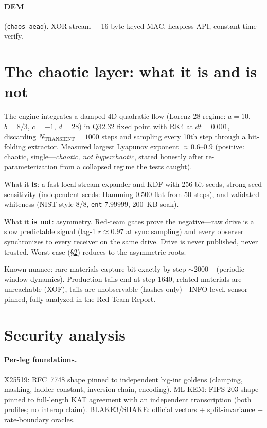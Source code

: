 \documentclass[11pt,a4paper]{article}
\begin{document}
\paragraph{DEM} (\texttt{chaos-aead}).
XOR stream + 16-byte keyed MAC, heapless API, constant-time verify.

\section{The chaotic layer: what it is and is not}

The engine integrates a damped 4D quadratic flow (Lorenz-28 regime:
$a=10$, $b=8/3$, $c=-1$, $d=28$) in Q32.32 fixed point with RK4 at $dt=0.001$,
discarding $N_{\mathrm{TRANSIENT}}=1000$ steps and sampling every 10th step through
a bit-folding extractor. Measured largest Lyapunov exponent $\approx 0.6$--$0.9$
(positive: chaotic, single---\emph{chaotic, not hyperchaotic}, stated honestly after
re-parameterization from a collapsed regime the tests caught).

What it \textbf{is}: a fast local stream expander and KDF with 256-bit seeds, strong
seed sensitivity (independent seeds: Hamming $0.500$ flat from 50 steps), and validated
whiteness (NIST-style 8/8, \texttt{ent} $7.99999$, 200~KB soak).

What it \textbf{is not}: asymmetry. Red-team gates prove the negative---raw drive is a
slow predictable signal (lag-1 $r \approx 0.97$ at sync sampling) and every observer
synchronizes to every receiver on the same drive. Drive is never published, never
trusted. Worst case (\S\ref{sec:security}) reduces to the asymmetric roots.

Known nuance: rare materials capture bit-exactly by step $\sim$2000+ (periodic-window
dynamics). Production tails end at step 1640, related materials are unreachable (XOF),
tails are unobservable (hashes only)---INFO-level, sensor-pinned, fully analyzed in
the Red-Team Report.

\section{Security analysis}
\label{sec:security}

\paragraph{Per-leg foundations.}
X25519: RFC~7748 shape pinned to independent big-int goldens (clamping, masking,
ladder constant, inversion chain, encoding). ML-KEM: FIPS-203 shape pinned to
full-length KAT agreement with an independent transcription (both profiles; no
interop claim). BLAKE3/SHAKE: official vectors + split-invariance + rate-boundary
oracles.
\end{document}
